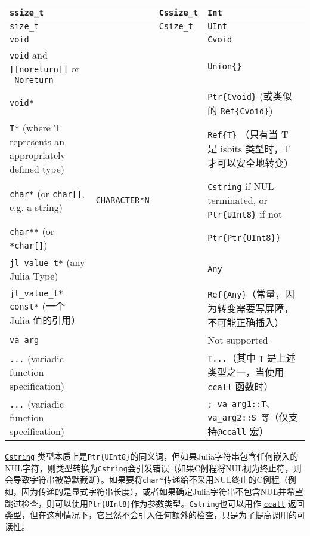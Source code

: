 \begin{table}[h]
\begin{tabulary}{\linewidth}{|L|L|L|L|}
\hline
\texttt{ssize\_t} &  & \texttt{Cssize\_t} & \texttt{Int} \\
\hline
\texttt{size\_t} &  & \texttt{Csize\_t} & \texttt{UInt} \\
\hline
\texttt{void} &  &  & \texttt{Cvoid} \\
\hline
\texttt{void} and \texttt{[[noreturn]]} or \texttt{\_Noreturn} &  &  & \texttt{Union\{\}} \\
\hline
\texttt{void*} &  &  & \texttt{Ptr\{Cvoid\}} (或类似的 \texttt{Ref\{Cvoid\}}) \\
\hline
\texttt{T*} (where T represents an appropriately defined type) &  &  & \texttt{Ref\{T\}} （只有当 T 是 isbits 类型时，T 才可以安全地转变） \\
\hline
\texttt{char*} (or \texttt{char[]}, e.g. a string) & \texttt{CHARACTER*N} &  & \texttt{Cstring} if NUL-terminated, or \texttt{Ptr\{UInt8\}} if not \\
\hline
\texttt{char**} (or \texttt{*char[]}) &  &  & \texttt{Ptr\{Ptr\{UInt8\}\}} \\
\hline
\texttt{jl\_value\_t*} (any Julia Type) &  &  & \texttt{Any} \\
\hline
\texttt{jl\_value\_t* const*} (一个 Julia 值的引用） &  &  & \texttt{Ref\{Any\}}（常量，因为转变需要写屏障，不可能正确插入） \\
\hline
\texttt{va\_arg} &  &  & Not supported \\
\hline
\texttt{...} (variadic function specification) &  &  & \texttt{T...}（其中 \texttt{T} 是上述类型之一，当使用 \texttt{ccall} 函数时） \\
\hline
\texttt{...} (variadic function specification) &  &  & \texttt{; va\_arg1::T、va\_arg2::S 等}（仅支持\texttt{@ccall} 宏） \\
\hline
\end{tabulary}

\end{table}



\hyperlink{8632604011862685836}{\texttt{Cstring}} 类型本质上是\texttt{Ptr\{UInt8\}}的同义词，但如果Julia字符串包含任何嵌入的NUL字符，则类型转换为\texttt{Cstring}会引发错误（如果C例程将NUL视为终止符，则会导致字符串被静默截断）。如果要将\texttt{char*}传递给不采用NUL终止的C例程（例如，因为传递的是显式字符串长度），或者如果确定Julia字符串不包含NUL并希望跳过检查，则可以使用\texttt{Ptr\{UInt8\}}作为参数类型。\texttt{Cstring}也可以用作 \hyperlink{14245046751182637566}{\texttt{ccall}} 返回类型，但在这种情况下，它显然不会引入任何额外的检查，只是为了提高调用的可读性。



